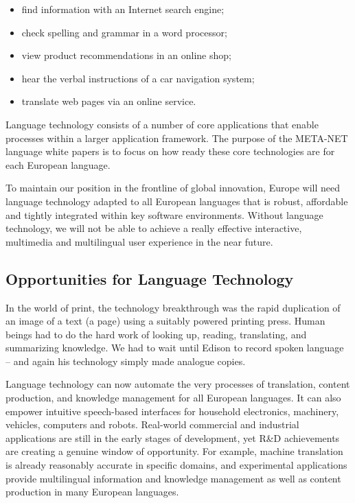 \begin{multicols}{2}
\begin{itemize}
      \item find information with an Internet search engine;
      \item check spelling and grammar in a word processor;
      \item view product recommendations in an online shop;
      \item hear the verbal instructions of a car navigation system;
      \item translate web pages via an online service.
\end{itemize}

Language technology consists of a number of core applications that enable processes within a larger application framework. The purpose of the META-NET language white papers is to focus on how ready these core technologies are for each European language. 


To maintain our position in the frontline of global innovation, Europe will need language technology adapted to all European languages that is robust, affordable and tightly integrated within key software environments. Without language technology, we will not be able to achieve a really effective interactive, multimedia and multilingual user experience in the near future.

\subsection{Opportunities for Language Technology}

In the world of print, the technology breakthrough was the rapid duplication of an image of a text (a page) using a suitably powered printing press. Human beings had to do the hard work of looking up, reading, translating, and summarizing knowledge. We had to wait until Edison to record spoken language – and again his technology simply made analogue copies.

Language technology can now automate the very processes of translation, content production, and knowledge management for all European languages. It can also empower intuitive speech-based interfaces for household electronics, machinery, vehicles, computers and robots. Real-world commercial and industrial applications are still in the early stages of development, yet R\&D achievements are creating a genuine window of opportunity. For example, machine translation is already reasonably accurate in specific domains, and experimental applications provide multilingual information and knowledge management as well as content production in many European languages. 


\end{multicols}
